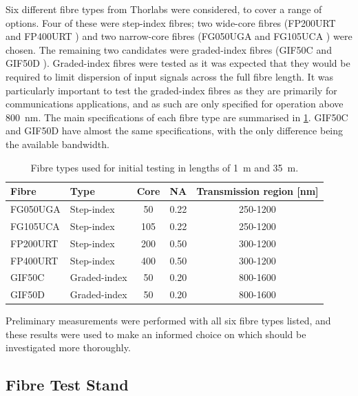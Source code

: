 \documentclass[a4paper,11pt]{article}
\begin{document}
Six different fibre types from Thorlabs were considered, to cover a range of options. Four of these were step-index fibres; two wide-core fibres (FP200URT \cite{bib:fp200urt} and FP400URT \cite{bib:fp400urt}) and two narrow-core fibres (FG050UGA \cite{bib:fg050uga} and FG105UCA \cite{bib:fg105uca}) were chosen. The remaining two candidates were graded-index fibres (GIF50C \cite{bib:gif50c} and GIF50D \cite{bib:gif50d}). Graded-index fibres were tested as it was expected that they would be required to limit dispersion of input signals across the full fibre length. It was particularly important to test the graded-index fibres as they are primarily for communications applications, and as such are only specified for operation above 800~nm. The main specifications of each fibre type are summarised in \cref{tab:fibres}. GIF50C and GIF50D have almost the same specifications, with the only difference being the available bandwidth.
\begin{table}[h]
\centering
\begin{tabular}{llccc}
\hline
Fibre	   & Type   		  & Core \diameter [$\mu$m] &  NA 	  &  Transmission region [nm]\\ \hline
FG050UGA   &  Step-index      &           \phantom{0}50  			&  0.22   &   250-1200       \\
FG105UCA   &  Step-index      &           105  			&  0.22   &   250-1200       \\
FP200URT   &  Step-index      &           200  			&  0.50   &   300-1200       \\
FP400URT   &  Step-index      &           400  			&  0.50   &   300-1200      \\
GIF50C     &  Graded-index    &           \phantom{0}50  			&  0.20	  &   800-1600       \\
GIF50D     &  Graded-index    &           \phantom{0}50 			&  0.20   &   800-1600      \\ \hline
\end{tabular}
\caption{Fibre types used for initial testing in lengths of 1~m and 35~m.}\label{tab:fibres}
\end{table}
Preliminary measurements were performed with all six fibre types listed, and these results were used to make an informed choice on which should be investigated more thoroughly.


\subsection{Fibre Test Stand}\label{sec:meas:sub:stand}
\end{document}
